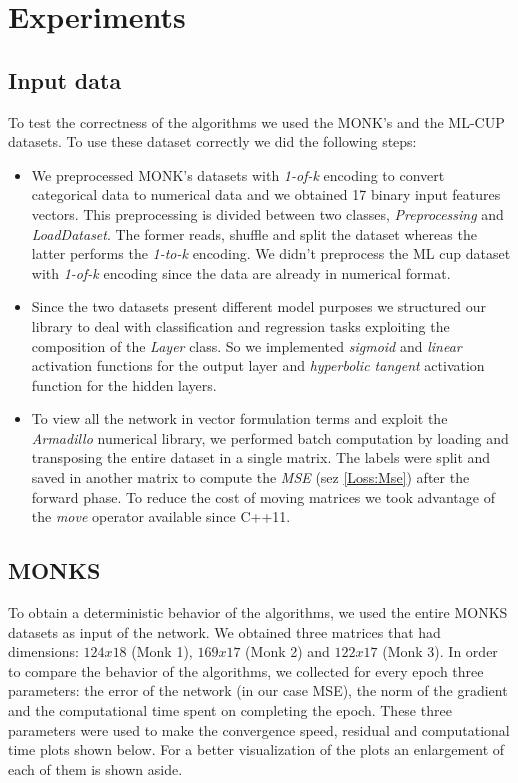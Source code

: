 \section{Experiments}

\subsection{Input data}
To test the correctness of the algorithms we used the MONK's and the ML-CUP datasets. To use these dataset correctly we did the following steps:
\begin{itemize}
	\item We preprocessed MONK's datasets with \textit{1-of-k} encoding to convert categorical data to numerical data and we obtained 17 binary input features vectors. This preprocessing is divided between two classes, \textit{Preprocessing} and \textit{LoadDataset}. The former reads, shuffle and split the dataset whereas the latter performs the \textit{1-to-k} encoding. We didn't preprocess the ML cup dataset with \textit{1-of-k} encoding since the data are already in numerical format.
	\item Since the two datasets present different model purposes we structured our library to deal with classification and regression tasks exploiting the composition of the \textit{Layer} class.  So we implemented \textit{sigmoid} and \textit{linear} activation functions for the output layer and \textit{hyperbolic tangent} activation function for the hidden layers.
	\item To view all the network in vector formulation terms and exploit the \textit{Armadillo} numerical library, we performed batch computation by loading and transposing the entire dataset in a single matrix. The labels were split and saved in another matrix to compute the \textit{MSE} (sez \ref{Loss:Mse}) after the forward phase. To reduce the cost of moving matrices we took advantage of the \textit{move} operator available since C++11. 
\end{itemize}

\subsection{MONKS} 
To obtain a deterministic behavior of the algorithms, we used the entire MONKS datasets as  input of the network. We obtained three matrices that had dimensions: $124x18$ (Monk 1), $169x17$ (Monk 2) and $122x17$ (Monk 3). In order to compare the behavior of the algorithms, we collected for every epoch three parameters: the error of the network (in our case MSE), the norm of the gradient and the computational time spent on completing the epoch. These three parameters were used to make the convergence speed, residual and computational time plots shown below. For a better visualization of the plots an enlargement of each of them is shown aside.

